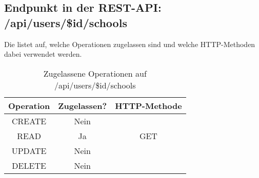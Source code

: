 \subsection{Endpunkt in der REST-API: /api/users/\$id/schools}
Die  listet auf, welche Operationen zugelassen sind und welche HTTP-Methoden dabei verwendet werden. 

\begin{table}[!htbp]
	\begin{tabular}{|c|c|c|}
		\hline
			\textbf{Operation} & \textbf{Zugelassen?} & \textbf{HTTP-Methode} \\ \hline
			CREATE & Nein &  \\ \hline 
			READ & Ja & GET \\ \hline
			UPDATE & Nein & \\ \hline 
			DELETE & Nein & \\ \hline
	\end{tabular}

		\caption{Zugelassene Operationen auf /api/users/\$id/schools}
		\label{tab:rest:api:users:id:schools:meth}
\end{table}

